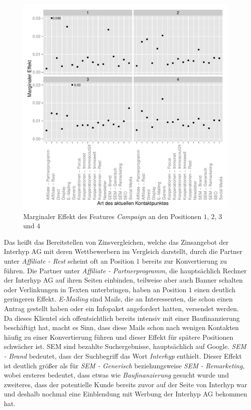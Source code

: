 \begin{figure}[H]
	\centering\includegraphics[scale=0.75]{marg_eff_campaign.pdf}\caption[Marginaler Effekt von \textit{Campaign}]{Marginaler Effekt des Features \textit{Campaign} an den Positionen $1$, $2$, $3$ und $4$}\label{marg_eff_campaign}
\end{figure}
\noindent Das heißt das Bereitstellen von Zinsvergleichen, welche das Zinsangebot der Interhyp AG mit deren Wettbewerbern im Vergleich darstellt, durch die Partner unter \textit{Affiliate - Rest} scheint oft an Position $1$ bereits zur Konvertierung zu führen. Die Partner unter \textit{Affiliate - Partnerprogramm}, die hauptsächlich Rechner der Interhyp AG auf ihren Seiten einbinden, teilweise aber auch Banner schalten oder Verlinkungen in Texten unterbringen, haben an Position $1$ einen deutlich geringeren Effekt. \textit{E-Mailing} sind Mails, die an Interessenten, die schon einen Antrag gestellt haben oder ein Infopaket angefordert hatten, versendet werden. Da dieses Klientel sich offentsichtlich bereits intensiv mit einer Baufinanzierung beschäftigt hat, macht es Sinn, dass diese Mails schon nach wenigen Kontakten häufig zu einer Konvertierung führen und dieser Effekt für spätere Positionen schwächer ist. SEM sind bezahlte Suchergebnisse, hauptsächlich auf Google. \textit{SEM - Brand} bedeutet, dass der Suchbegriff das Wort \textit{Interhyp} enthielt. Dieser Effekt ist deutlich größer als für \textit{SEM - Generisch} beziehungsweise \textit{SEM - Remarketing}, wobei ersteres bedeutet, dass etwas wie \textit{Baufinanzierung} gesucht wurde und zweiteres, dass der potentielle Kunde bereits zuvor auf der Seite von Interhyp war und deshalb nochmal eine Einblendung mit Werbung der Interhyp AG bekommen hat.
